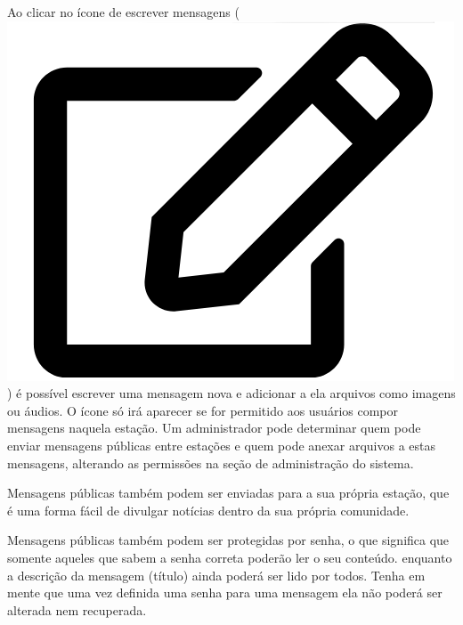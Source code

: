 \documentclass[11pt,a4paper]{article}
\begin{document}
Ao clicar no ícone de escrever mensagens (\includegraphics[height=0.8\baselineskip]{pictures/edit.png}) é possível escrever uma mensagem nova e adicionar a ela arquivos como imagens ou áudios. O ícone só irá aparecer se for permitido aos usuários compor mensagens naquela estação. Um administrador pode determinar quem pode enviar mensagens públicas entre estações e quem pode anexar arquivos a estas mensagens, alterando as permissões na seção de administração do sistema.



Mensagens públicas também podem ser enviadas para a sua própria estação, que é uma forma fácil de divulgar notícias dentro da sua própria comunidade. 

Mensagens públicas também podem ser protegidas por senha, o que significa que somente aqueles que sabem a senha correta poderão ler o seu conteúdo. enquanto a descrição da mensagem (título) ainda poderá ser lido por todos. Tenha em mente que uma vez definida uma senha para uma mensagem ela não poderá ser alterada nem recuperada. 
\end{document}
